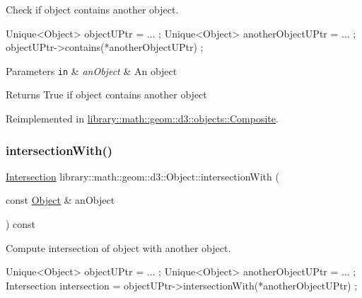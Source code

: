 Check if object contains another object. 


\begin{DoxyCode}
Unique<Object> objectUPtr = ... ;
Unique<Object> anotherObjectUPtr = ... ;
objectUPtr->contains(*anotherObjectUPtr) ;
\end{DoxyCode}



\begin{DoxyParams}[1]{Parameters}
\mbox{\tt in}  & {\em an\+Object} & An object \\
\hline
\end{DoxyParams}
\begin{DoxyReturn}{Returns}
True if object contains another object 
\end{DoxyReturn}


Reimplemented in \hyperlink{classlibrary_1_1math_1_1geom_1_1d3_1_1objects_1_1_composite_a3ec9ea04f09dea14be1e0f7eaa477c04}{library\+::math\+::geom\+::d3\+::objects\+::\+Composite}.

\mbox{\label{classlibrary_1_1math_1_1geom_1_1d3_1_1_object_a609b1ea1d5f868b004726622efabad5d}} 
\subsubsection{\texorpdfstring{intersection\+With()}{intersectionWith()}}
{\footnotesize\ttfamily \hyperlink{classlibrary_1_1math_1_1geom_1_1d3_1_1_intersection}{Intersection} library\+::math\+::geom\+::d3\+::\+Object\+::intersection\+With (\begin{DoxyParamCaption}\item[{const \hyperlink{classlibrary_1_1math_1_1geom_1_1d3_1_1_object}{Object} \&}]{an\+Object }\end{DoxyParamCaption}) const\hspace{0.3cm}{\ttfamily [virtual]}}



Compute intersection of object with another object. 


\begin{DoxyCode}
Unique<Object> objectUPtr = ... ;
Unique<Object> anotherObjectUPtr = ... ;
Intersection intersection = objectUPtr->intersectionWith(*anotherObjectUPtr) ;
\end{DoxyCode}



